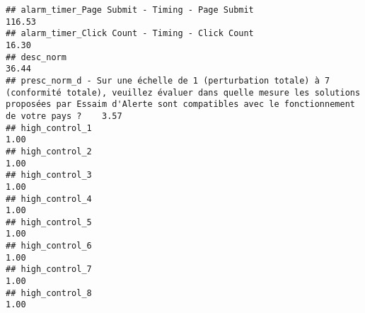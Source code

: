 \documentclass[
]{article}
\begin{document}
\begin{verbatim}
## alarm_timer_Page Submit - Timing - Page Submit                                                                                                                                                                              116.53
## alarm_timer_Click Count - Timing - Click Count                                                                                                                                                                               16.30
## desc_norm                                                                                                                                                                                                                    36.44
## presc_norm_d - Sur une échelle de 1 (perturbation totale) à 7 (conformité totale), veuillez évaluer dans quelle mesure les solutions proposées par Essaim d'Alerte sont compatibles avec le fonctionnement de votre pays ?    3.57
## high_control_1                                                                                                                                                                                                                1.00
## high_control_2                                                                                                                                                                                                                1.00
## high_control_3                                                                                                                                                                                                                1.00
## high_control_4                                                                                                                                                                                                                1.00
## high_control_5                                                                                                                                                                                                                1.00
## high_control_6                                                                                                                                                                                                                1.00
## high_control_7                                                                                                                                                                                                                1.00
## high_control_8                                                                                                                                                                                                                1.00

\end{verbatim}
\end{document}

